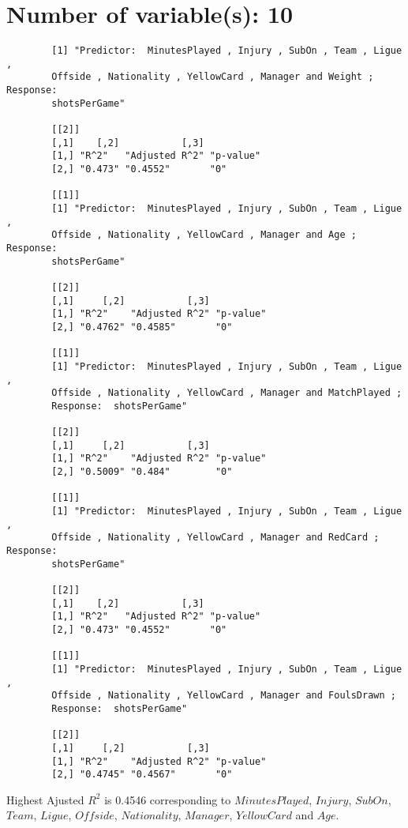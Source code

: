 \documentclass[12pt]{article}
\begin{document}
	\section{Number of variable(s): 10}
	\begin{verbatim}
		[1] "Predictor:  MinutesPlayed , Injury , SubOn , Team , Ligue , 
		Offside , Nationality , YellowCard , Manager and Weight ; Response:  
		shotsPerGame"
		
		[[2]]
		[,1]    [,2]           [,3]     
		[1,] "R^2"   "Adjusted R^2" "p-value"
		[2,] "0.473" "0.4552"       "0"      
		
		[[1]]
		[1] "Predictor:  MinutesPlayed , Injury , SubOn , Team , Ligue , 
		Offside , Nationality , YellowCard , Manager and Age ; Response:  
		shotsPerGame"
		
		[[2]]
		[,1]     [,2]           [,3]     
		[1,] "R^2"    "Adjusted R^2" "p-value"
		[2,] "0.4762" "0.4585"       "0"      
		
		[[1]]
		[1] "Predictor:  MinutesPlayed , Injury , SubOn , Team , Ligue , 
		Offside , Nationality , YellowCard , Manager and MatchPlayed ; 
		Response:  shotsPerGame"
		
		[[2]]
		[,1]     [,2]           [,3]     
		[1,] "R^2"    "Adjusted R^2" "p-value"
		[2,] "0.5009" "0.484"        "0"      
		
		[[1]]
		[1] "Predictor:  MinutesPlayed , Injury , SubOn , Team , Ligue , 
		Offside , Nationality , YellowCard , Manager and RedCard ; Response:  
		shotsPerGame"
		
		[[2]]
		[,1]    [,2]           [,3]     
		[1,] "R^2"   "Adjusted R^2" "p-value"
		[2,] "0.473" "0.4552"       "0"      
		
		[[1]]
		[1] "Predictor:  MinutesPlayed , Injury , SubOn , Team , Ligue , 
		Offside , Nationality , YellowCard , Manager and FoulsDrawn ; 
		Response:  shotsPerGame"
		
		[[2]]
		[,1]     [,2]           [,3]     
		[1,] "R^2"    "Adjusted R^2" "p-value"
		[2,] "0.4745" "0.4567"       "0"    
	\end{verbatim}
	Highest Ajusted $ R^2 $ is 0.4546 corresponding to $ MinutesPlayed $, $ Injury $, $ SubOn $, $ Team $, $ Ligue $, $ Offside $, $ Nationality $, $ Manager $, $ YellowCard $ and $ Age $.
	
\end{document}
